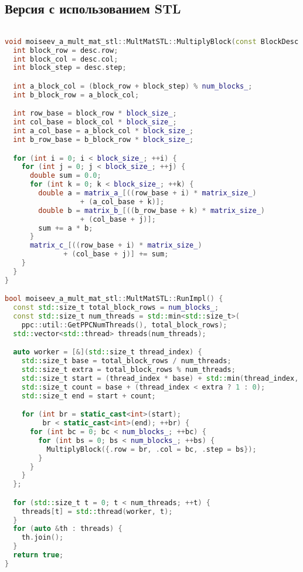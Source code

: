 \documentclass[14pt,a4paper]{extarticle}
\begin{document}
\subsection{Версия с использованием STL}
\begin{lstlisting}[frame=single,language=C++,basicstyle=\small]

void moiseev_a_mult_mat_stl::MultMatSTL::MultiplyBlock(const BlockDesc &desc) {
  int block_row = desc.row;
  int block_col = desc.col;
  int block_step = desc.step;

  int a_block_col = (block_row + block_step) % num_blocks_;
  int b_block_row = a_block_col;

  int row_base = block_row * block_size_;
  int col_base = block_col * block_size_;
  int a_col_base = a_block_col * block_size_;
  int b_row_base = b_block_row * block_size_;

  for (int i = 0; i < block_size_; ++i) {
    for (int j = 0; j < block_size_; ++j) {
      double sum = 0.0;
      for (int k = 0; k < block_size_; ++k) {
        double a = matrix_a_[((row_base + i) * matrix_size_) 
                  + (a_col_base + k)];
        double b = matrix_b_[((b_row_base + k) * matrix_size_) 
                  + (col_base + j)];
        sum += a * b;
      }
      matrix_c_[((row_base + i) * matrix_size_) 
              + (col_base + j)] += sum;
    }
  }
}

bool moiseev_a_mult_mat_stl::MultMatSTL::RunImpl() {
  const std::size_t total_block_rows = num_blocks_;
  const std::size_t num_threads = std::min<std::size_t>(
    ppc::util::GetPPCNumThreads(), total_block_rows);
  std::vector<std::thread> threads(num_threads);

  auto worker = [&](std::size_t thread_index) {
    std::size_t base = total_block_rows / num_threads;
    std::size_t extra = total_block_rows % num_threads;
    std::size_t start = (thread_index * base) + std::min(thread_index, extra);
    std::size_t count = base + (thread_index < extra ? 1 : 0);
    std::size_t end = start + count;

    for (int br = static_cast<int>(start); 
         br < static_cast<int>(end); ++br) {
      for (int bc = 0; bc < num_blocks_; ++bc) {
        for (int bs = 0; bs < num_blocks_; ++bs) {
          MultiplyBlock({.row = br, .col = bc, .step = bs});
        }
      }
    }
  };

  for (std::size_t t = 0; t < num_threads; ++t) {
    threads[t] = std::thread(worker, t);
  }
  for (auto &th : threads) {
    th.join();
  }
  return true;
}
\end{lstlisting}
\end{document}

